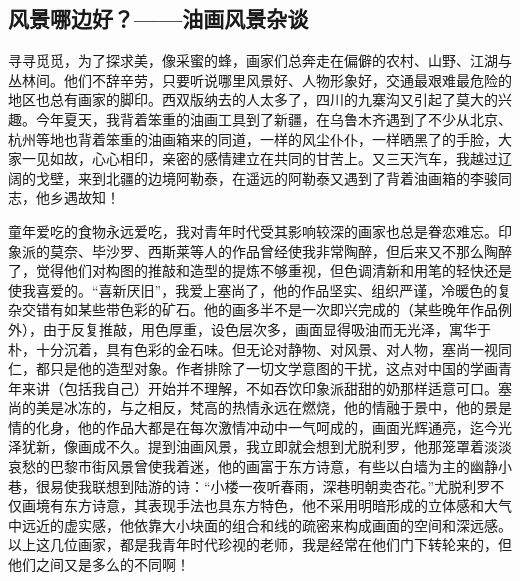 \documentclass{article}
\begin{document}
\subsection{风景哪边好？——油画风景杂谈}
寻寻觅觅，为了探求美，像采蜜的蜂，画家们总奔走在偏僻的农村、山野、江湖与丛林间。他们不辞辛劳，只要听说哪里风景好、人物形象好，交通最艰难最危险的地区也总有画家的脚印。西双版纳去的人太多了，四川的九寨沟又引起了莫大的兴趣。今年夏天，我背着笨重的油画工具到了新疆，在乌鲁木齐遇到了不少从北京、杭州等地也背着笨重的油画箱来的同道，一样的风尘仆仆，一样晒黑了的手脸，大家一见如故，心心相印，亲密的感情建立在共同的甘苦上。又三天汽车，我越过辽阔的戈壁，来到北疆的边境阿勒泰，在遥远的阿勒泰又遇到了背着油画箱的李骏同志，他乡遇故知！

童年爱吃的食物永远爱吃，我对青年时代受其影响较深的画家也总是眷恋难忘。印象派的莫奈、毕沙罗、西斯莱等人的作品曾经使我非常陶醉，但后来又不那么陶醉了，觉得他们对构图的推敲和造型的提炼不够重视，但色调清新和用笔的轻快还是使我喜爱的。“喜新厌旧”，我爱上塞尚了，他的作品坚实、组织严谨，冷暖色的复杂交错有如某些带色彩的矿石。他的画多半不是一次即兴完成的（某些晚年作品例外），由于反复推敲，用色厚重，设色层次多，画面显得吸油而无光泽，寓华于朴，十分沉着，具有色彩的金石味。但无论对静物、对风景、对人物，塞尚一视同仁，都只是他的造型对象。作者排除了一切文学意图的干扰，这点对中国的学画青年来讲（包括我自己）开始并不理解，不如吞饮印象派甜甜的奶那样适意可口。塞尚的美是冰冻的，与之相反，梵高的热情永远在燃烧，他的情融于景中，他的景是情的化身，他的作品大都是在每次激情冲动中一气呵成的，画面光辉通亮，迄今光泽犹新，像画成不久。提到油画风景，我立即就会想到尤脱利罗，他那笼罩着淡淡哀愁的巴黎市街风景曾使我着迷，他的画富于东方诗意，有些以白墙为主的幽静小巷，很易使我联想到陆游的诗：“小楼一夜听春雨，深巷明朝卖杏花。”尤脱利罗不仅画境有东方诗意，其表现手法也具东方特色，他不采用明暗形成的立体感和大气中远近的虚实感，他依靠大小块面的组合和线的疏密来构成画面的空间和深远感。以上这几位画家，都是我青年时代珍视的老师，我是经常在他们门下转轮来的，但他们之间又是多么的不同啊！
\end{document}
